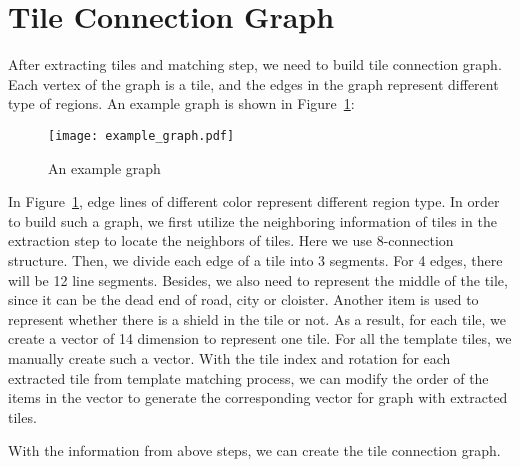 \section{Tile Connection Graph}
After extracting tiles and matching step, we need to build tile connection graph. Each vertex of the graph is a tile, and the edges in the 
graph represent different type of regions. An example graph is shown in Figure~\ref{eg_graph}:

\begin{figure}[htbp]
	  \centering
	  \texttt{[image: example\_graph.pdf]}
	  \caption{An example graph}
	  \label{eg_graph}
\end{figure}

In Figure~\ref{eg_graph}, edge lines of different color represent different region type. In order to build such a graph, we first utilize the 
neighboring information of tiles in the extraction step to locate the neighbors of tiles. Here we use 8-connection structure. Then, we divide each edge of a tile into 3 segments. For 4 edges, there will be 12 line segments. Besides, we also need to represent the middle of the tile, since it can be the dead end of road, city or cloister. Another item is used to represent whether there is a shield in the tile or not. As a 
result, for each tile, we create a vector of 14 dimension to represent one tile. For all the template tiles, we manually create such a vector. With the tile index and rotation for each extracted tile from template matching process, we can modify the order of the items in the 
vector to generate the corresponding vector for graph with extracted tiles.

With the information from above steps, we can create the tile connection graph. 